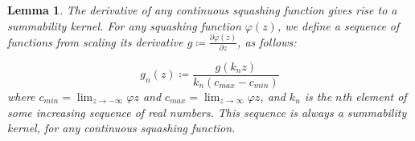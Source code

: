 \documentclass{article} %
\newtheorem{lem}[thm]{Lemma}
\begin{document}
\begin{lem}\label{lem:squashderivissum}
	The derivative of any continuous squashing function gives rise to a summability kernel.
	For any squashing function $\varphi(z)$,
	we define a sequence of functions from scaling its derivative 
    $g \coloneqq \frac{\partial\varphi(z)}{\partial z}$, as follows:
    
    
	\begin{equation}
	g_n(z) \coloneqq \frac{g(k_n z)}{k_n\left( c_{max} - c_{min} \right)} 
	\end{equation}
	 where $c_{min}=\lim_{z \to -\infty} \varphi{z}$ and $c_{max}=\lim_{z \to \infty} \varphi{z}$,
	 and $k_n$ is the $n$th element of some increasing sequence of real numbers.
	This sequence is always a summability kernel, for any continuous squashing function.
	

\end{lem}
\end{document}
